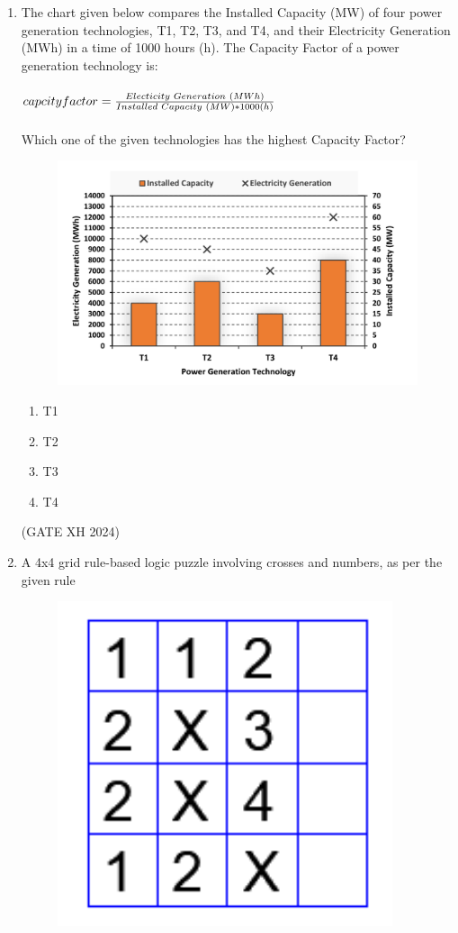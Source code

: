 \documentclass{article}
\begin{document}
\begin{enumerate}
    \item The chart given below compares the Installed Capacity (MW) of four power generation technologies, T1, T2, T3, and T4, and their Electricity Generation (MWh) in a time of 1000 hours (h). The Capacity Factor of a power generation technology is: \\ \\
    $capcity factor=\frac{Electicity \hspace{0.1cm}Generation \hspace{0.1cm} (MWh)}{Installed \hspace{0.1cm} Capacity \hspace{0.1cm} (MW) *1000(h)}$ \\ \\
    Which one of the given technologies has the highest Capacity Factor?

    \begin{figure}[h]
        \centering
        \includegraphics[width=0.6\columnwidth]{Figures/asg1 fig1.png}
        \caption{}
        \label{Figure 1}
    \end{figure}

    \begin{multicols}{4}
    \begin{enumerate}
        \item T1
        \item T2
        \item T3
        \item T4
    \end{enumerate}
    \end{multicols} \hfill (GATE XH 2024)

    \item A 4x4 grid rule-based logic puzzle involving crosses and numbers, as per the given rule

    \begin{figure}[h]
        \centering
        \includegraphics[width=0.4\columnwidth]{Figures/asg1 fig2.png}
        \caption{}
        \label{Figure 2}
    \end{figure}


\end{enumerate}
\end{document}
